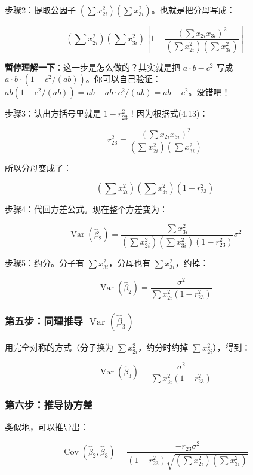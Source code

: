 \documentclass[12pt,a4paper]{ctexart}
\newcommand{\Var}{\operatorname{Var}}
\newcommand{\Cov}{\operatorname{Cov}}
\begin{document}
步骤2：提取公因子 $(\sum x_{2i}^2)(\sum x_{3i}^2)$。也就是把分母写成：

\[
(\sum x_{2i}^2)(\sum x_{3i}^2)\left[1 - \frac{(\sum x_{2i} x_{3i})^2}{(\sum x_{2i}^2)(\sum x_{3i}^2)}\right]
\]

\textbf{暂停理解一下}：这一步是怎么做的？其实就是把 $a \cdot b - c^2$ 写成 $a \cdot b \cdot (1 - c^2/(ab))$。你可以自己验证：$ab(1 - c^2/(ab)) = ab - ab \cdot c^2/(ab) = ab - c^2$。没错吧！

步骤3：认出方括号里就是 $1 - r_{23}^2$！因为根据式(4.13)：

\[
r_{23}^2 = \frac{(\sum x_{2i} x_{3i})^2}{(\sum x_{2i}^2)(\sum x_{3i}^2)}
\]

所以分母变成了：

\[
(\sum x_{2i}^2)(\sum x_{3i}^2)(1 - r_{23}^2)
\]

步骤4：代回方差公式。现在整个方差变为：

\[
\Var(\hat{\beta}_2) = \frac{\sum x_{3i}^2}{(\sum x_{2i}^2)(\sum x_{3i}^2)(1 - r_{23}^2)} \sigma^2
\]

步骤5：约分。分子有 $\sum x_{3i}^2$，分母也有 $\sum x_{3i}^2$，约掉：

\begin{equation}
\Var(\hat{\beta}_2) = \frac{\sigma^2}{\sum x_{2i}^2 (1 - r_{23}^2)} \tag{4.14}
\end{equation}

\subsubsection{第五步：同理推导 $\Var(\hat{\beta}_3)$}

用完全对称的方式（分子换为 $\sum x_{2i}^2$，约分时约掉 $\sum x_{2i}^2$），得到：

\begin{equation}
\Var(\hat{\beta}_3) = \frac{\sigma^2}{\sum x_{3i}^2 (1 - r_{23}^2)} \tag{4.15}
\end{equation}

\subsubsection{第六步：推导协方差}

类似地，可以推导出：

\begin{equation}
\Cov(\hat{\beta}_2, \hat{\beta}_3) = \frac{-r_{23} \sigma^2}{(1 - r_{23}^2)\sqrt{(\sum x_{2i}^2)(\sum x_{3i}^2)}} \tag{4.16}
\end{equation}
\end{document}

